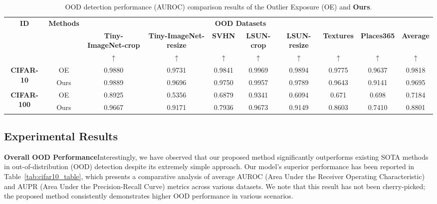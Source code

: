 \documentclass[letterpaper]{article} %
\begin{document}
\begin{table}[!ht]
\renewcommand\arraystretch{1.0}
\begin{adjustbox}{width=17.8cm,center}
\begin{tabular}{c|c|ccccccc|c} \toprule
\multirow{3}{*}{\textbf{ID}} & \multirow{3}{*}{\textbf{Methods}} & \multicolumn{7}{c}{\textbf{OOD Datasets}} \\
 &  & \multicolumn{1}{c}{\textbf{Tiny-ImageNet-crop}} & \multicolumn{1}{c}{\textbf{Tiny-ImageNet-resize}} & \multicolumn{1}{c}{\textbf{SVHN}} & \multicolumn{1}{c}{\textbf{LSUN-crop}} & \multicolumn{1}{c}{\textbf{LSUN-resize}} & \multicolumn{1}{c}{\textbf{Textures}} & \multicolumn{1}{c|}{\textbf{Places365}}& \multicolumn{1}{c}{\textbf{Average}} \\
 &  & $\uparrow$ & $\uparrow$ & $\uparrow$ & $\uparrow$ & $\uparrow$ & $\uparrow$ & $\uparrow$ & $\uparrow$\\ \midrule
\multirow{2}{*}{\textbf{CIFAR-10}} 
 & OE  &0.9880	&0.9731	&0.9841	&0.9969	&0.9894	&0.9775	&0.9637	&0.9818\\
\cline{2-10}
 & Ours &0.9889	&0.9696	&0.9750	&0.9957	&0.9789	&0.9643	&0.9141	&0.9695\\ 
 \hline
 \multirow{2}{*}{\textbf{CIFAR-100}} 
 & OE   &0.8925	&0.5356	&0.6879	&0.9341	&0.6094	&0.671	&0.698	&0.7184\\
\cline{2-10}
 & Ours &0.9667	&0.9171	&0.7936	&0.9673	&0.9149	&0.8603	&0.7410	&0.8801\\ 
 \bottomrule
\end{tabular}
\end{adjustbox}
\caption{OOD detection performance (AUROC) comparison results of the Outlier Exposure (OE) and \textbf{Ours}.}
\label{tab:OE_comparison_table}
\end{table}
\vspace{-0.1cm}

\subsection{Experimental Results}
\textbf{Overall OOD Performance}\indent Interestingly, we have observed that our proposed method significantly outperforms existing SOTA methods in out-of-distribution (OOD) detection despite its extremely simple approach. Our model's superior performance has been reported in Table~\ref{tab:cifar10_table}, which presents a comparative analysis of average AUROC (Area Under the Receiver Operating Characteristic) and AUPR (Area Under the Precision-Recall Curve) metrics across various datasets. We note that this result has not been cherry-picked; the proposed method consistently demonstrates higher OOD performance in various scenarios.
\end{document}
